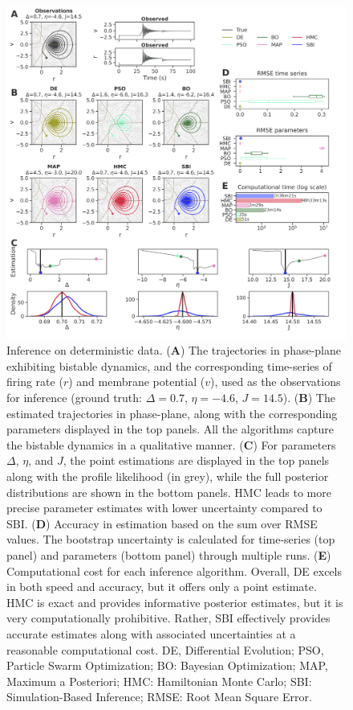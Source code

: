 \documentclass[preprint,11pt,authoryear]{elsarticle}
\begin{document}
\begin{figure}[p]
    \centering
    \includegraphics[width=\linewidth]{Figs/Fig1.png}
    \caption{Inference on deterministic data.  
     (\textbf{A}) The trajectories in phase-plane exhibiting bistable dynamics, and the corresponding time-series of firing rate ($r$) and membrane potential ($v$), used as the observations for inference (ground truth: $\Delta=0.7$, $\eta=-4.6$, $J=14.5$). (\textbf{B}) The estimated trajectories in phase-plane, along with the corresponding parameters displayed in the top panels. All the algorithms capture the bistable dynamics in a qualitative manner. (\textbf{C}) For parameters $\Delta$, $\eta$, and $J$, the point estimations are displayed in the top panels along with the profile likelihood (in grey), while the full posterior distributions are shown in the bottom panels. HMC leads to more precise parameter estimates with lower uncertainty compared to SBI.  (\textbf{D}) Accuracy in estimation based on the sum over RMSE values. The bootstrap uncertainty is calculated for time-series (top panel) and parameters (bottom panel) through multiple runs. (\textbf{E}) Computational cost for each inference algorithm.  Overall, DE excels in both speed and accuracy, but it offers only a point estimate. HMC is exact and provides informative posterior estimates, but it is very computationally prohibitive. Rather, SBI effectively provides accurate estimates along with associated uncertainties at a reasonable computational cost. DE, Differential Evolution; PSO, Particle Swarm Optimization; BO: Bayesian Optimization; MAP, Maximum a Posteriori; HMC: Hamiltonian Monte Carlo;  SBI: Simulation-Based Inference; RMSE: Root Mean Square Error.
    } 
    \label{fig:ODEdata}
\end{figure}
\end{document}
